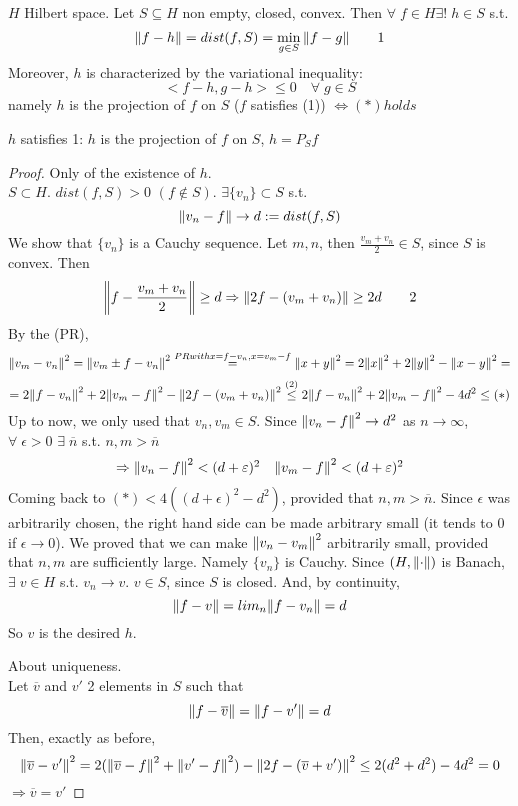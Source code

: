 \begin{theorem}
    \(H\) Hilbert space. Let \(S \subseteq H\) non empty, closed, convex. Then \(\forall \; f \in H \exists! \; h \in S\) s.t. 
    \[
        \norm{f-h} = dist (f, S) = \min_{g \in S} \norm{f-g} \tag*{1}
    \]
    Moreover, \(h\) is characterized by the variational inequality:
    \[
        <f-h, g-h> \leq 0 \quad \forall \; g \in S \tag*{*}
    \]
    namely \(h\) is the projection of \(f \) on \(S\) (\(f\) satisfies (1)) \(\iff (*) holds\)
\end{theorem}
\begin{remark}
    \(h\) satisfies 1: \(h\) is the projection of \(f\) on \(S\), \(h = P_S f\)
\end{remark}
\begin{proof}
    Only of the existence of \(h\). \\
    \(S \subset H\). \(dist(f, S) >0\) \((f \notin S )\). \(\exists \{v_n\} \subset S\) s.t. 
    \[
        \norm{v_n -f} \to d := dist(f, S)    
    \] 
    We show that \(\{v_n\}\) is a Cauchy sequence. Let \(m, n\), then \(\frac{v_m + v_n}{2} \in S\), since \(S\) is convex. Then 
    \[
        \norm{f - \frac{v_m + v_n}{2}} \geq d \Rightarrow \norm{2f - (v_m + v_n)} \geq 2d \tag*{2}
    \]
    By the (PR), 
    \[
        \norm{v_m - v_n}^2 
        = \norm{v_m \pm f - v_n}^2 
        \overset{PR with x=f-v_n, x=v_m-f}{=} \norm{x+y}^2
        = 2\norm{x}^2 + 2 \norm{y}^2 - \norm{x-y}^2 =
    \]
    \[
        = 2 \norm{f-v_n}^2 + 2 \norm{v_m - f }^2 - \norm{2f - (v_m + v_n)}^2
        \overset{(2)}{\leq} 2 \norm{f - v_n}^2 + 2 \norm{v_m - f}^2 - 4d^2 \leq (*)
    \]
    Up to now, we only used that \(v_n , v_m \in S\). Since \(\norm{v_n -f }^2 \to d^2\) as \(n \to \infty\), \(\forall\; \epsilon>0 \) \(\exists \; \overline{n}\) s.t. \(n, m > \overline{n}\)
    \[
        \begin{array}{ll}
            \Rightarrow \norm{v_n - f}^2 < (d+\varepsilon)^2 & \norm{v_m - f}^2 < (d+\varepsilon)^2
        \end{array}
    \]
    Coming back to \((*)< 4((d+\epsilon)^2 -d^2)\), provided that \(n, m > \overline{n}\). Since \(\epsilon\) was arbitrarily chosen, the right hand side can be made arbitrary small (it tends to 0 if \(\epsilon \to 0\)). 
    We proved that we can make \(\norm{v_n - v_m}^2\) arbitrarily small, provided that \(n, m\) are sufficiently large.
    Namely \(\{v_n\}\) is Cauchy. Since \((H, \norm{\cdot})\) is Banach, \(\exists \; v \in H\) s.t. \(v_n \to v\). \(v \in S\), since \(S\) is closed. And, by continuity, 
    \[
        \norm{f-v} = lim_n \norm{f - v_n} = d
    \]
    So \(v\) is the desired \(h\).
    
    About uniqueness. \\
    Let \(\overline{v}\) and \(v'\) 2 elements in \(S\) such that
    \[
        \norm{f- \overline{v}} = \norm{f - v'} = d
    \]
    Then, exactly as before, 
    \[
        \norm{\overline{v} - v'}^2 = 2(\norm{\overline{v} - f}^2 + \norm{v' -f}^2) - \norm{2f - (\overline{v}+v')}^2 \leq 2 (d^2+d^2)-4d^2 = 0
    \]
    \(\Rightarrow \overline{v} = v'\)
\end{proof}

